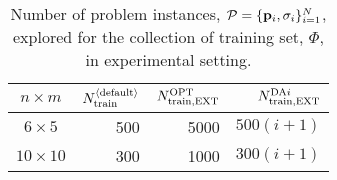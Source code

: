 \begin{table}[p]
\centering
\caption[Number of problem instances explored for the collection of training 
set.]{Number of problem instances, $\mathcal{P} = 
    \{\mathbf{p}_i,{\mathbf{\sigma}}_i\}_{i=1}^{N}$, explored for the collection of training 
    set, $\Phi$, in experimental setting.}
\label{tbl:Ntrain}
\begin{tabular}{crrr} \toprule
$n \times m$  & $N_{\text{train}}^{\langle \text{default} \rangle}$ 
                     & $N_{\text{train},\text{EXT}}^{\text{OPT}}$ 
                              & $N_{\text{train},\text{EXT}}^{\text{DA}i}$ \\ \midrule
$6\times 5$   & 500  & 5000   & $500(i+1)$ \\
$10\times 10$ & 300  & 1000   & $300(i+1)$ \\
\bottomrule
\end{tabular}
\end{table}